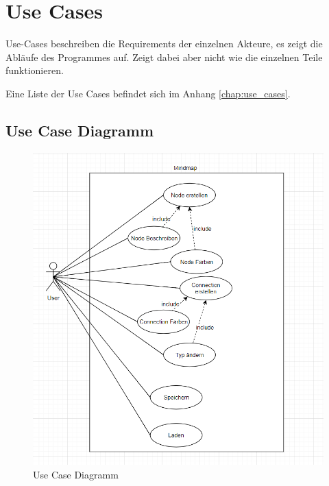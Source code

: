 \section{Use Cases}
\label{sec:use_cases}
Use-Cases beschreiben die Requirements der einzelnen Akteure, es zeigt die Abläufe des Programmes auf. Zeigt dabei aber nicht wie die einzelnen Teile funktionieren.

Eine Liste der Use Cases befindet sich im Anhang \ref{chap:use_cases}.

\subsection{Use Case Diagramm}
\label{subsec:use_case_diagramm}

\begin{figure}[H]
	\centering
		\includegraphics[scale=0.7]{images/UseCaseDiagram.PNG}
	\caption{Use Case Diagramm}
	\label{fig:use_case_diagramm}
\end{figure}

